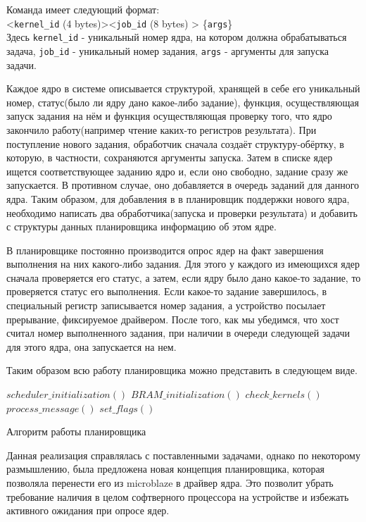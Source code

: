 Команда имеет следующий формат:\\
<\texttt {kernel\_id} (4 bytes)><\texttt {job\_id} (8 bytes) > \{\texttt{args}\} ~\\

Здесь \texttt {kernel\_id} - уникальный номер ядра, на котором должна
обрабатываться задача, \texttt{job\_id} - уникальный номер задания,
\texttt{args} - аргументы для запуска задачи.

Каждое ядро в системе описывается структурой, хранящей в себе его уникальный
номер, статус(было ли ядру дано какое-либо задание), функция, осуществляющая
запуск задания на нём и функция осуществляющая проверку того, что ядро
закончило работу(например чтение каких-то регистров результата). При
поступление нового задания, обработчик сначала создаёт структуру-обёртку, в
которую, в частности, сохраняются аргументы запуска. Затем в списке ядер ищется
соответствующее заданию ядро и, если оно свободно, задание сразу же
запускается. В противном случае, оно добавляется в очередь заданий для данного
ядра. Таким образом, для добавления в в планировщик поддержки нового ядра,
необходимо написать два обработчика(запуска и проверки результата) и добавить с
структуры данных планировщика информацию об этом ядре.

В планировщике постоянно производится опрос ядер на факт завершения выполнения
на них какого-либо задания. Для этого у каждого из имеющихся ядер сначала
проверяется его статус, а затем, если ядру было дано какое-то задание, то
проверяется статус его выполнения. Если какое-то задание завершилось,
в специальный регистр записывается номер задания, а устройство посылает
прерывание, фиксируемое драйвером.  После того, как мы убедимся, что хост считал
номер выполненного задания, при наличии в очереди следующей задачи для этого
ядра, она запускается на нем.

Таким образом всю работу планировщика можно представить в следующем виде.

  \begin{algo}
\begin{algorithmic}
	\STATE $scheduler\_initialization()$
	\STATE $BRAM\_initialization()$
	\WHILE {\TRUE}
		\STATE $check\_kernels()$
			\STATE $process\_message()$
			\STATE $set\_flags()$
		\ENDIF
	\ENDWHILE
\end{algorithmic}
  \caption{Алгоритм работы планировщика}
  \end{algo}
  
Данная реализация справлялась с поставленными задачами, однако по некоторому
размышлению, была предложена новая концепция планировщика, которая позволяла
перенести его из microblaze в драйвер ядра. Это позволит убрать требование
наличия в целом софтверного процессора на устройстве и избежать активного
ожидания при опросе ядер.

